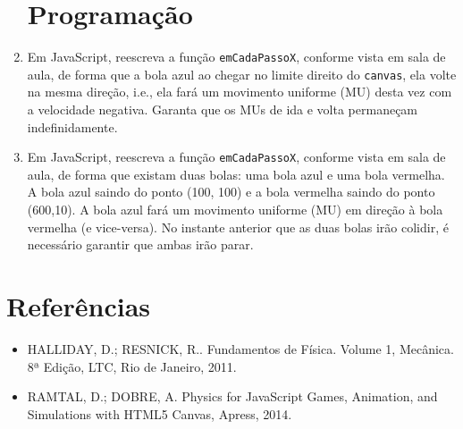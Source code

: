 \documentclass[12pt,a4paper,oneside]{article}
\begin{document}
\begin{enumerate}
\section{Programação}

	\item Em JavaScript, reescreva a função {\tt emCadaPassoX}, conforme vista em sala de aula, de forma que a bola azul ao chegar no limite direito do {\tt canvas}, ela volte na mesma direção, i.e., ela fará um movimento uniforme (MU) desta vez com a velocidade negativa. Garanta que os MUs de ida e volta permaneçam indefinidamente.
	
	\item Em JavaScript, reescreva a função {\tt emCadaPassoX}, conforme vista em sala de aula, de forma que existam duas bolas: uma bola azul e uma bola vermelha. A bola azul saindo do ponto (100, 100) e a bola vermelha saindo do ponto (600,10). A bola azul fará um movimento uniforme (MU) em direção à bola vermelha (e vice-versa). No instante anterior que as duas bolas irão colidir, é necessário garantir que ambas irão parar.
		
\end{enumerate}

\section{Referências}

\begin{itemize}
	\item HALLIDAY, D.; RESNICK, R.. Fundamentos de Física. Volume 1, Mecânica. 8ª Edição, LTC, Rio de Janeiro, 2011.

	\item RAMTAL, D.; DOBRE, A. Physics for JavaScript Games, Animation, and Simulations with HTML5 Canvas, Apress, 2014.
\end{itemize}
\end{document}
